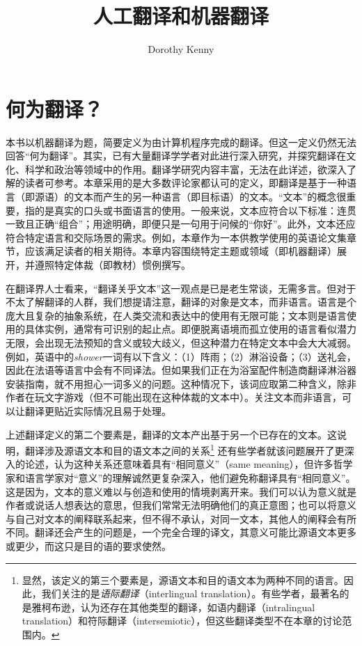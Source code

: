 \documentclass[output=paper]{langscibook}
\author{Dorothy Kenny\orcid{0000-0002-4793-9256}\affiliation{都柏林城市大学}}
\title{人工翻译和机器翻译}
\begin{document}
\maketitle

\section{何为翻译？}\label{sec:kenny:1}
本书以机器翻译为题，简要定义为由计算机程序完成的翻译。但这一定义仍然无法回答“何为翻译”。其实，已有大量翻译学学者对此进行深入研究，并探究翻译在文化、科学和政治等领域中的作用。翻译学研究内容丰富，无法在此详述，欲深入了解的读者可参考\citet{Baker2020}。本章采用的是大多数评论家都认可的定义，即翻译是基于一种语言（即源语）的文本而产生的另一种语言（即目标语）的文本。“文本”的概念很重要，指的是真实的口头或书面语言的使用。一般来说，文本应符合以下标准：连贯一致且正确“组合”；用途明确，即便只是一句用于问候的“你好”。此外，文本还应符合特定语言和交际场景的需求。例如，本章作为一本供教学使用的英语论文集章节，应该满足读者的相关期待。本章内容围绕特定主题或领域（即机器翻译）展开，并遵照特定体裁（即教材）惯例撰写。

在翻译界人士看来，“翻译关乎文本”这一观点是已是老生常谈，无需多言。但对于不太了解翻译的人群，我们想提请注意，翻译的对象是文本，而非语言。语言是个庞大且复杂的抽象系统，在人类交流和表达中的使用有无限可能；文本则是语言使用的具体实例，通常有可识别的起止点。即便脱离语境而孤立使用的语言看似潜力无限，会出现无法预知的含义或较大歧义，但这种潜力在特定文本中会大大减弱。例如，英语中的\emph{shower}一词有以下含义：（1）阵雨；（2）淋浴设备；（3）送礼会，因此在法语等语言中会有不同译法。但如果我们正在为浴室配件制造商翻译淋浴器安装指南，就不用担心一词多义的问题。这种情况下，该词应取第二种含义，除非作者在玩文字游戏（但不可能出现在这种体裁的文本中）。关注文本而非语言，可以让翻译更贴近实际情况且易于处理。

上述翻译定义的第二个要素是，翻译的文本产出基于另一个已存在的文本。这说明，翻译涉及源语文本和目的语文本之间的关系\footnote{显然，该定义的第三个要素是，源语文本和目的语文本为两种不同的语言。因此，我们关注的是\textit{语际翻译}（interlingual translation）。有些学者，最著名的是雅柯布逊\citet{Jakobson1959}，认为还存在其他类型的翻译，如语内翻译（intralingual translation）和符际翻译（intersemiotic），但这些翻译类型不在本章的讨论范围内。} 还有些学者就该问题展开了更深入的论述，认为这种关系还意味着具有“相同意义”（same meaning），但许多哲学家和语言学家对“意义”的理解诚然更复杂深入，他们避免称翻译具有“相同意义”。这是因为，文本的意义难以与创造和使用的情境剥离开来。我们可以认为意义就是作者或说话人想表达的意思，但我们常常无法明确他们的真正意图；也可以将意义与自己对文本的阐释联系起来，但不得不承认，对同一文本，其他人的阐释会有所不同。翻译还会产生的问题是，一个完全合理的译文，其意义可能比源语文本更多或更少，而这只是目的语的要求使然。
\end{document}
